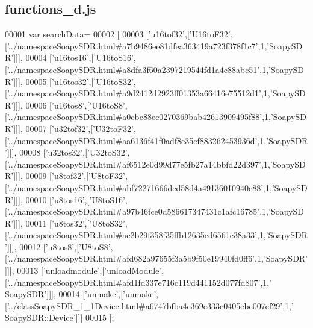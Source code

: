 \subsection{functions\+\_\+d.\+js}
\label{functions__d_8js_source}

\begin{DoxyCode}
00001 var searchData=
00002 [
00003   [\textcolor{stringliteral}{'u16tof32'},[\textcolor{stringliteral}{'U16toF32'},[\textcolor{stringliteral}{'../namespaceSoapySDR.html#a7b9486ee81dfea363419a723f378f1c7'},1,\textcolor{stringliteral}{'SoapySDR'}]]],
00004   [\textcolor{stringliteral}{'u16tos16'},[\textcolor{stringliteral}{'U16toS16'},[\textcolor{stringliteral}{'../namespaceSoapySDR.html#a8dfa3f60a2397219544fd1a4c88abc51'},1,\textcolor{stringliteral}{'SoapySDR'}]]],
00005   [\textcolor{stringliteral}{'u16tos32'},[\textcolor{stringliteral}{'U16toS32'},[\textcolor{stringliteral}{'../namespaceSoapySDR.html#a9d2412d2923ff01353a66416e75512d1'},1,\textcolor{stringliteral}{'SoapySDR'}]]],
00006   [\textcolor{stringliteral}{'u16tos8'},[\textcolor{stringliteral}{'U16toS8'},[\textcolor{stringliteral}{'../namespaceSoapySDR.html#a0cbc88ec0270369bab42613909495f88'},1,\textcolor{stringliteral}{'SoapySDR'}]]],
00007   [\textcolor{stringliteral}{'u32tof32'},[\textcolor{stringliteral}{'U32toF32'},[\textcolor{stringliteral}{'../namespaceSoapySDR.html#aa6136f41f0adf8e35cf883262453936d'},1,\textcolor{stringliteral}{'SoapySDR'}]]],
00008   [\textcolor{stringliteral}{'u32tos32'},[\textcolor{stringliteral}{'U32toS32'},[\textcolor{stringliteral}{'../namespaceSoapySDR.html#af6512e0d99d77e5fb27a14bbfd22d397'},1,\textcolor{stringliteral}{'SoapySDR'}]]],
00009   [\textcolor{stringliteral}{'u8tof32'},[\textcolor{stringliteral}{'U8toF32'},[\textcolor{stringliteral}{'../namespaceSoapySDR.html#abf72271666dcd58d4a49136010940e88'},1,\textcolor{stringliteral}{'SoapySDR'}]]],
00010   [\textcolor{stringliteral}{'u8tos16'},[\textcolor{stringliteral}{'U8toS16'},[\textcolor{stringliteral}{'../namespaceSoapySDR.html#a97b46fce0d586617347431c1afc16785'},1,\textcolor{stringliteral}{'SoapySDR'}]]],
00011   [\textcolor{stringliteral}{'u8tos32'},[\textcolor{stringliteral}{'U8toS32'},[\textcolor{stringliteral}{'../namespaceSoapySDR.html#ac2b29f358f35ffb12635ed6561c38a33'},1,\textcolor{stringliteral}{'SoapySDR'}]]],
00012   [\textcolor{stringliteral}{'u8tos8'},[\textcolor{stringliteral}{'U8toS8'},[\textcolor{stringliteral}{'../namespaceSoapySDR.html#afd682a97655f3a5b9f50e19940fd0ff6'},1,\textcolor{stringliteral}{'SoapySDR'}]]],
00013   [\textcolor{stringliteral}{'unloadmodule'},[\textcolor{stringliteral}{'unloadModule'},[\textcolor{stringliteral}{'../namespaceSoapySDR.html#afd1fd337e716c119d441152d077fd807'},1,\textcolor{stringliteral}{'
      SoapySDR'}]]],
00014   [\textcolor{stringliteral}{'unmake'},[\textcolor{stringliteral}{'unmake'},[\textcolor{stringliteral}{'../classSoapySDR\_1\_1Device.html#a6747bfba4c369c333e0405ebe007ef29'},1,\textcolor{stringliteral}{'
      SoapySDR::Device'}]]]
00015 ];
\end{DoxyCode}
